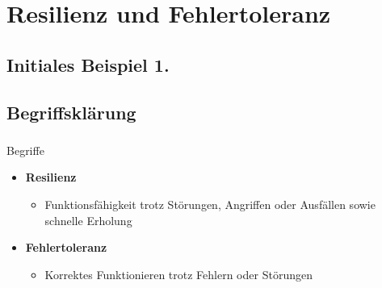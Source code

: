 %

\section{Resilienz und Fehlertoleranz}

\subsection{Initiales Beispiel 1.}

\begin{frame}
    \frametitle{\insertsection}
    \framesubtitle{\insertsubsection}

\end{frame}

\subsection{Begriffsklärung}

\begin{frame}
    \frametitle{\insertsection}
    \framesubtitle{\insertsubsection}

    \begin{block}{Begriffe}
        \begin{itemize}
            \item \textbf{Resilienz}
                \begin{itemize}
                     \item Funktionsfähigkeit trotz Störungen, Angriffen oder Ausfällen sowie schnelle Erholung\\
                \end{itemize}
            \item \textbf{Fehlertoleranz}
                \begin{itemize}
                    \item Korrektes Funktionieren trotz Fehlern oder Störungen
                \end{itemize}
        \end{itemize}
    \end{block}
\end{frame}


